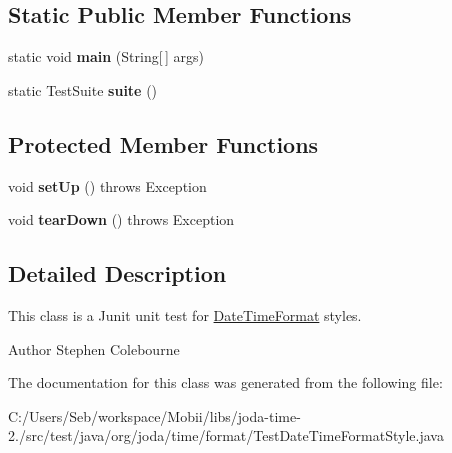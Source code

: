 \subsection*{Static Public Member Functions}
\begin{DoxyCompactItemize}
\item 
\hypertarget{classorg_1_1joda_1_1time_1_1format_1_1_test_date_time_format_style_a86b1cda75cdb65e8c7ffe391d16c2569}{static void {\bfseries main} (String\mbox{[}$\,$\mbox{]} args)}\label{classorg_1_1joda_1_1time_1_1format_1_1_test_date_time_format_style_a86b1cda75cdb65e8c7ffe391d16c2569}

\item 
\hypertarget{classorg_1_1joda_1_1time_1_1format_1_1_test_date_time_format_style_a0b42e690198ec9e21302c1364b96db5e}{static Test\-Suite {\bfseries suite} ()}\label{classorg_1_1joda_1_1time_1_1format_1_1_test_date_time_format_style_a0b42e690198ec9e21302c1364b96db5e}

\end{DoxyCompactItemize}
\subsection*{Protected Member Functions}
\begin{DoxyCompactItemize}
\item 
\hypertarget{classorg_1_1joda_1_1time_1_1format_1_1_test_date_time_format_style_a350fd14b923bb0062881b070ebae6c8b}{void {\bfseries set\-Up} ()  throws Exception }\label{classorg_1_1joda_1_1time_1_1format_1_1_test_date_time_format_style_a350fd14b923bb0062881b070ebae6c8b}

\item 
\hypertarget{classorg_1_1joda_1_1time_1_1format_1_1_test_date_time_format_style_a80f56952fe7b7086b3c7b581cfb75388}{void {\bfseries tear\-Down} ()  throws Exception }\label{classorg_1_1joda_1_1time_1_1format_1_1_test_date_time_format_style_a80f56952fe7b7086b3c7b581cfb75388}

\end{DoxyCompactItemize}


\subsection{Detailed Description}
This class is a Junit unit test for \hyperlink{classorg_1_1joda_1_1time_1_1format_1_1_date_time_format}{Date\-Time\-Format} styles.

\begin{DoxyAuthor}{Author}
Stephen Colebourne 
\end{DoxyAuthor}


The documentation for this class was generated from the following file\-:\begin{DoxyCompactItemize}
\item 
C\-:/\-Users/\-Seb/workspace/\-Mobii/libs/joda-\/time-\/2./src/test/java/org/joda/time/format/Test\-Date\-Time\-Format\-Style.\-java\end{DoxyCompactItemize}
